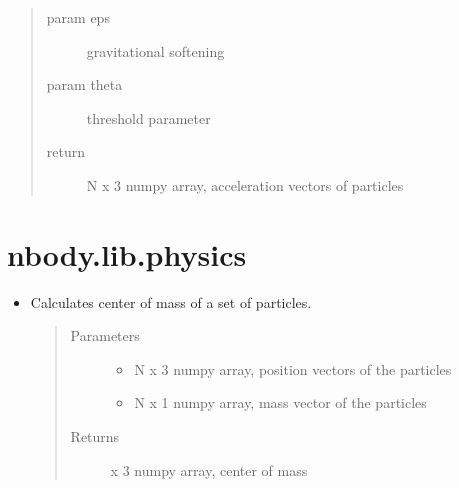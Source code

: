 \documentclass[letterpaper,10pt,english]{sphinxmanual}
\begin{document}
\begin{itemize}
\begin{fulllineitems}
\begin{description}
\begin{quote}
\begin{description}
\item[{param eps}] \leavevmode
\sphinxAtStartPar
gravitational softening

\item[{param theta}] \leavevmode
\sphinxAtStartPar
threshold parameter

\item[{return}] \leavevmode
\sphinxAtStartPar
N x 3 numpy array, acceleration vectors of particles

\end{description}\end{quote}

\end{description}

\end{fulllineitems}


\end{itemize}


\section{nbody.lib.physics}
\label{\detokenize{physics:nbody-lib-physics}}\label{\detokenize{physics::doc}}\begin{itemize}
\item {} 

\begin{fulllineitems}
\label{\detokenize{physics:nbody.lib.physics.calc_com}}
\sphinxAtStartPar
Calculates center of mass of a set of particles.
\begin{quote}\begin{description}
\item[{Parameters}] \leavevmode\begin{itemize}
\item {} 
\sphinxAtStartPar
{} \textendash{} N x 3 numpy array, position vectors of the particles

\item {} 
\sphinxAtStartPar
{} \textendash{} N x 1 numpy array, mass vector of the particles

\end{itemize}

\item[{Returns}] \leavevmode
{} x 3 numpy array, center of mass

\end{description}\end{quote}

\end{fulllineitems}


\end{itemize}
\end{document}
